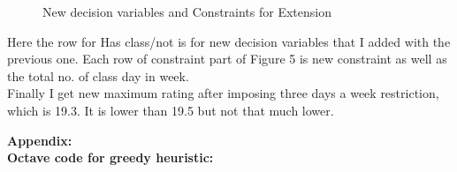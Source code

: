 \documentclass[paper=letter, fontsize=11pt]{scrartcl} %
\begin{document}
\begin{figure}[H]
  
  \centering
    \caption{New decision variables and Constraints for Extension}
\end{figure}
Here the row for Has class/not is for new decision variables that I added with the previous one. Each row of constraint part of Figure 5 is new constraint as well as the total no. of class day in week.\\
Finally I get new maximum rating after imposing three days a week restriction, which is 19.3. It is lower than 19.5 but not that much lower.   


\newpage
\Large \textbf{Appendix:}\\
\newline
 \normalsize \textbf{Octave code for greedy heuristic:}


\end{document}
